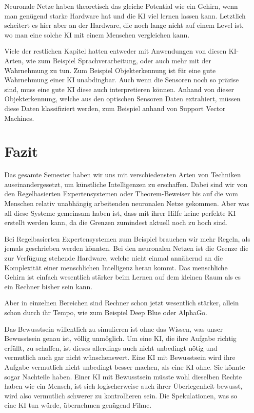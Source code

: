 Neuronale Netze haben theoretisch das gleiche Potential wie ein Gehirn, wenn man genügend starke Hardware hat und die KI viel lernen lassen kann.
Letztlich scheitert es hier aber an der Hardware, die noch lange nicht auf einem Level ist, wo man eine solche KI mit einem Menschen vergleichen kann.

Viele der restlichen Kapitel hatten entweder mit Anwendungen von diesen KI-Arten, wie zum Beispiel Sprachverarbeitung, oder auch mehr mit der Wahrnehmung zu tun.
Zum Beispiel Objekterkennung ist für eine gute Wahrnehmung einer KI unabdingbar.
Auch wenn die Sensoren noch so präzise sind, muss eine gute KI diese auch interpretieren können.
Anhand von dieser Objekterkennung, welche aus den optischen Sensoren Daten extrahiert, müssen diese Daten klassifiziert werden, zum Beispiel anhand von Support Vector Machines.

\section{Fazit}
Das gesamte Semester haben wir uns mit verschiedensten Arten von Techniken auseinandergesetzt, um künstliche Intelligenzen zu erschaffen.
Dabei sind wir von den Regelbasierten Expertensystemen oder Theorem-Beweiser bis auf die vom Menschen relativ unabhängig arbeitenden neuronalen Netze gekommen.
Aber was all diese Systeme gemeinsam haben ist, dass mit ihrer Hilfe keine perfekte KI erstellt werden kann, da die Grenzen zumindest aktuell noch zu hoch sind.

Bei Regelbasierten Expertensystemen zum Beispiel brauchen wir mehr Regeln, als jemals geschrieben werden könnten.
Bei den neuronalen Netzen ist die Grenze die zur Verfügung stehende Hardware, welche nicht einmal annähernd an die Komplexität einer menschlichen Intelligenz heran kommt.
Das menschliche Gehirn ist einfach wesentlich stärker beim Lernen auf dem kleinen Raum als es ein Rechner bisher sein kann.

Aber in einzelnen Bereichen sind Rechner schon jetzt wesentlich stärker, allein schon durch ihr Tempo, wie zum Beispiel Deep Blue oder AlphaGo.

Das Bewusstsein willentlich zu simulieren ist ohne das Wissen, was unser Bewusstsein genau ist, völlig unmöglich.
Um eine KI, die ihre Aufgabe richtig erfüllt, zu schaffen, ist dieses allerdings auch nicht unbedingt nötig und vermutlich auch gar nicht wünschenswert.
Eine KI mit Bewusstsein wird ihre Aufgabe vermutlich nicht unbedingt besser machen, als eine KI ohne.
Sie könnte sogar Nachteile haben.
Einer KI mit Bewusstsein müsste wohl dieselben Rechte haben wie ein Mensch, ist sich logischerweise auch ihrer Überlegenheit bewusst, wird also vermutlich schwerer zu kontrollieren sein.
Die Spekulationen, was so eine KI tun würde, übernehmen genügend Filme.

